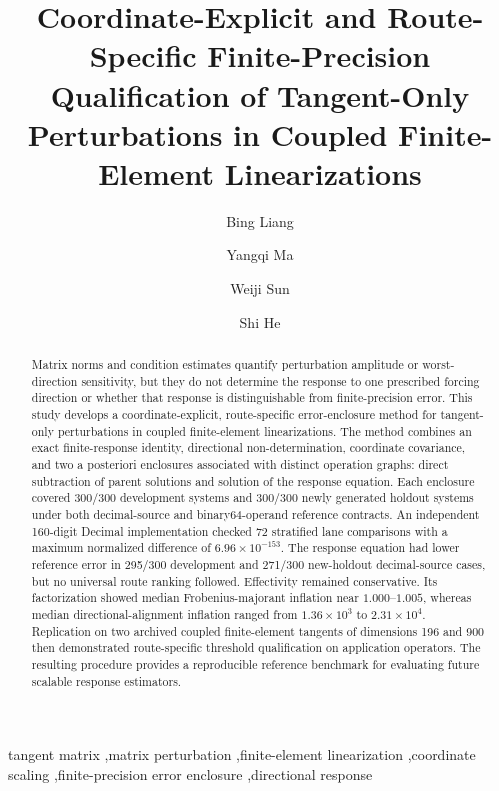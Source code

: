 \documentclass[preprint,12pt]{elsarticle}
\theoremstyle{definition}
\begin{document}
\begin{frontmatter}

\title{Coordinate-Explicit and Route-Specific Finite-Precision Qualification of Tangent-Only Perturbations in Coupled Finite-Element Linearizations}
\author[aff1]{Bing Liang}
\author[aff1]{Yangqi Ma}
\author[aff1]{Weiji Sun}
\author[aff2]{Shi He}
\address[aff1]{School of Mechanics and Engineering, Liaoning Technical University, No. 47 Zhonghua Road, Fuxin, Liaoning 123000, China}
\address[aff2]{China Coal Research Institute, Beijing 100013, China}

\begin{abstract}
Matrix norms and condition estimates quantify perturbation amplitude or worst-direction sensitivity, but they do not determine the response to one prescribed forcing direction or whether that response is distinguishable from finite-precision error. This study develops a coordinate-explicit, route-specific error-enclosure method for tangent-only perturbations in coupled finite-element linearizations. The method combines an exact finite-response identity, directional non-determination, coordinate covariance, and two a posteriori enclosures associated with distinct operation graphs: direct subtraction of parent solutions and solution of the response equation. Each enclosure covered 300/300 development systems and 300/300 newly generated holdout systems under both decimal-source and binary64-operand reference contracts. An independent 160-digit Decimal implementation checked 72 stratified lane comparisons with a maximum normalized difference of $6.96\times10^{-153}$. The response equation had lower reference error in 295/300 development and 271/300 new-holdout decimal-source cases, but no universal route ranking followed. Effectivity remained conservative. Its factorization showed median Frobenius-majorant inflation near $1.000$--$1.005$, whereas median directional-alignment inflation ranged from $1.36\times10^{3}$ to $2.31\times10^{4}$. Replication on two archived coupled finite-element tangents of dimensions 196 and 900 then demonstrated route-specific threshold qualification on application operators. The resulting procedure provides a reproducible reference benchmark for evaluating future scalable response estimators.
\end{abstract}

\begin{keyword}
tangent matrix \sep matrix perturbation \sep finite-element linearization \sep coordinate scaling \sep finite-precision error enclosure \sep directional response
\end{keyword}

\end{frontmatter}
\linenumbers
\end{document}

